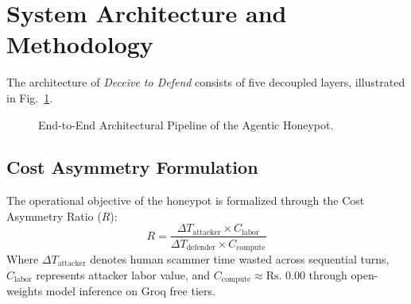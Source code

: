\documentclass[conference]{IEEEtran}
\begin{document}
\section{System Architecture and Methodology}
The architecture of \textit{Deceive to Defend} consists of five decoupled layers, illustrated in Fig.~\ref{fig:architecture}.

\begin{figure}[t]
\centering
{}
\caption{End-to-End Architectural Pipeline of the Agentic Honeypot.}
\label{fig:architecture}
\end{figure}

\subsection{Cost Asymmetry Formulation}
The operational objective of the honeypot is formalized through the Cost Asymmetry Ratio ($R$):
\begin{equation}
R = \frac{\Delta T_{\text{attacker}} \times C_{\text{labor}}}{\Delta T_{\text{defender}} \times C_{\text{compute}}}
\end{equation}
Where $\Delta T_{\text{attacker}}$ denotes human scammer time wasted across sequential turns, $C_{\text{labor}}$ represents attacker labor value, and $C_{\text{compute}} \approx \text{Rs.~0.00}$ through open-weights model inference on Groq free tiers.
\end{document}
